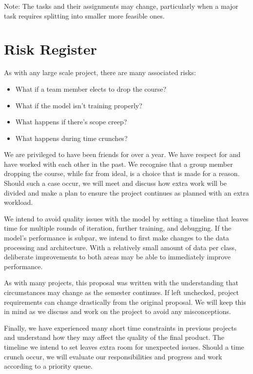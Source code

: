 \documentclass{article} %
\begin{document}
Note: The tasks and their assignments may change, particularly when a major task requires splitting into smaller more feasible ones. 


\section{Risk Register}
As with any large scale project, there are many associated risks:

\begin{itemize}
  \item What if a team member elects to drop the course?
  \item What if the model isn't training properly?
  \item What happens if there's scope creep?
  \item What happens during time crunches?
\end{itemize}

We are privileged to have been friends for over a year. We have respect for and have worked with each other in the past. We recognise that a group member dropping the course, while far from ideal, is a choice that is made for a reason. Should such a case occur, we will meet and discuss how extra work will be divided and make a plan to ensure the project continues as planned with an extra workload.

We intend to avoid quality issues with the model by setting a timeline that leaves time for multiple rounds of iteration, further training, and debugging. If the model's performance is subpar, we intend to first make changes to the data processing and architecture. With a relatively small amount of data per class, deliberate improvements to both areas may be able to immediately improve performance.

As with many projects, this proposal was written with the understanding that circumstances may change as the semester continues. If left unchecked, project requirements can change drastically from the original proposal. We will keep this in mind as we discuss and work on the project to avoid any misconceptions.

Finally, we have experienced many short time constraints in previous projects and understand how they may affect the quality of the final product. The timeline we intend to set leaves extra room for unexpected issues. Should a time crunch occur, we will evaluate our responsibilities and progress and work according to a priority queue.

\label{last_page}



\end{document}
